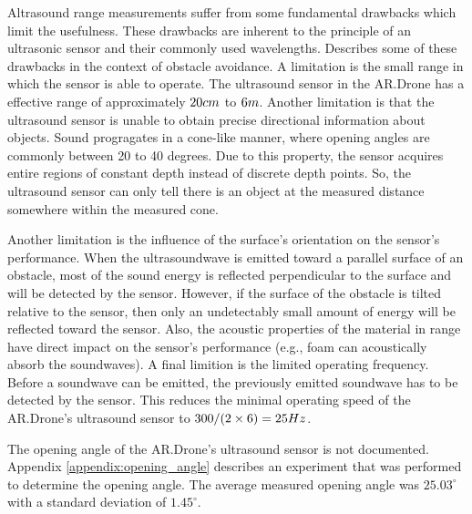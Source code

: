 Altrasound range measurements suffer from some fundamental drawbacks which limit the usefulness.
These drawbacks are inherent to the principle of an ultrasonic sensor and their commonly used wavelengths.
\cite{borenstein1988obstacle} Describes some of these drawbacks in the context of obstacle avoidance.
A limitation is the small range in which the sensor is able to operate.
The ultrasound sensor in the AR.Drone has a effective range of approximately $20\small{cm}$ to $6\small{m}$.
Another limitation is that the ultrasound sensor is unable to obtain precise directional information about objects.
Sound progragates in a cone-like manner, where opening angles are commonly between 20 to 40 degrees.
Due to this property, the sensor acquires entire regions of constant depth instead of discrete depth points.
So, the ultrasound sensor can only tell there is an object at the measured distance somewhere within the measured cone.

Another limitation is the influence of the surface's orientation on the sensor's performance.
When the ultrasoundwave is emitted toward a parallel surface of an obstacle, most of the sound energy is reflected perpendicular to the surface and will be detected by the sensor.
However, if the surface of the obstacle is tilted relative to the sensor, then only an undetectably small amount of energy will be reflected toward the sensor.
Also, the acoustic properties of the material in range have direct impact on the sensor's performance (e.g., foam can acoustically absorb the soundwaves).
A final limition is the limited operating frequency.
Before a soundwave can be emitted, the previously emitted soundwave has to be detected by the sensor.
This reduces the minimal operating speed of the AR.Drone's ultrasound sensor to $300 / (2 \times 6) = 25\small{Hz}$.

The opening angle of the AR.Drone's ultrasound sensor is not documented.
Appendix \ref{appendix:opening_angle} describes an experiment that was performed to determine the opening angle.
The average measured opening angle was $25.03^{\circ}$ with a standard deviation of $1.45^{\circ}$.

